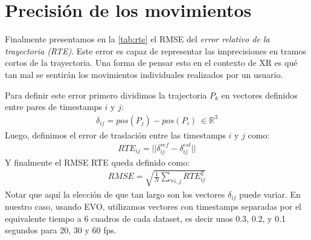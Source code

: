 \documentclass[ twoside,openright,titlepage,numbers=noenddot,%
                headinclude,footinclude,cleardoublepage=empty,abstract=on,
                BCOR=-5mm,paper=a4,fontsize=11pt
                ]{scrreprt}
\newcommand{\R}{\mathbb{R}}
\begin{document}
\hypertarget{precisiuxf3n-de-los-movimientos}{%
\section{Precisión de los
movimientos}\label{precisiuxf3n-de-los-movimientos}}

Finalmente presentamos en la \autoref{tab:rte} el RMSE del \emph{error
relativo de la trayectoria (RTE)}. Este error es capaz de representar
las imprecisiones en tramos cortos de la trayectoria. Una forma de
pensar esto en el contexto de XR es qué tan mal se sentirán los
movimientos individuales realizados por un usuario.

Para definir este error primero dividimos la trajectoria \(P_k\) en
vectores definidos entre pares de timestamps \(i\) y \(j\):
\begin{align}
\delta_{ij} = pos(P_j) - pos(P_i) \ \in \R^3
\end{align} Luego, definimos el error de traslación entre las timestamps
\(i\) y \(j\) como: \begin{align}
RTE_{ij} = ||\delta^{ref}_{ij} - \delta^{est}_{ij}||
\end{align} Y finalmente el RMSE RTE queda definido como: \begin{align}
RMSE = \sqrt{\frac{1}{N} \sum_{\forall i, j} RTE_{ij}^2}
\end{align} Notar que aquí la elección de que tan largo son los vectores
\(\delta_{ij}\) puede variar. En nuestro caso, usando EVO, utilizamos
vectores con timestamps separadas por el equivalente tiempo a 6 cuadros
de cada dataset, es decir unos 0.3, 0.2, y 0.1 segundos para 20, 30 y 60
fps.
\end{document}
